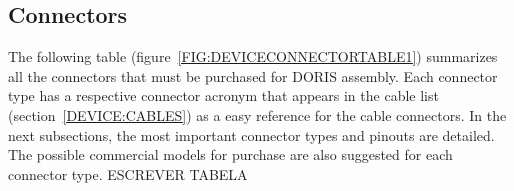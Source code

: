 \subsection{Connectors} \label{DEVICE:CONNECTORS}
The following table (figure~\ref{FIG:DEVICECONNECTORTABLE1}) summarizes all the connectors that must be purchased for DORIS assembly. Each connector type has a respective connector acronym that appears in the cable list (section~\ref{DEVICE:CABLES}) as a easy reference for the cable connectors. In the next subsections, the most important connector types and pinouts are detailed. The possible commercial models for purchase are also suggested for each connector type. ESCREVER TABELA
